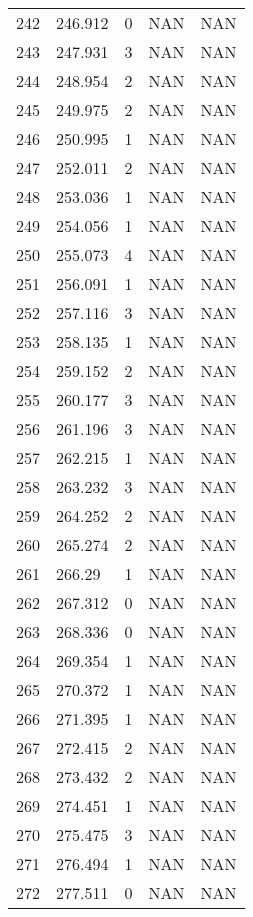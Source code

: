 \documentclass{article}
\begin{document}
\begin{longtable}{@{}lllll@{}}
				242 & 246.912 & 0     & NAN   & NAN   \\
				243 & 247.931 & 3     & NAN   & NAN   \\
				244 & 248.954 & 2     & NAN   & NAN   \\
				245 & 249.975 & 2     & NAN   & NAN   \\
				246 & 250.995 & 1     & NAN   & NAN   \\
				247 & 252.011 & 2     & NAN   & NAN   \\
				248 & 253.036 & 1     & NAN   & NAN   \\
				249 & 254.056 & 1     & NAN   & NAN   \\
				250 & 255.073 & 4     & NAN   & NAN   \\
				251 & 256.091 & 1     & NAN   & NAN   \\
				252 & 257.116 & 3     & NAN   & NAN   \\
				253 & 258.135 & 1     & NAN   & NAN   \\
				254 & 259.152 & 2     & NAN   & NAN   \\
				255 & 260.177 & 3     & NAN   & NAN   \\
				256 & 261.196 & 3     & NAN   & NAN   \\
				257 & 262.215 & 1     & NAN   & NAN   \\
				258 & 263.232 & 3     & NAN   & NAN   \\
				259 & 264.252 & 2     & NAN   & NAN   \\
				260 & 265.274 & 2     & NAN   & NAN   \\
				261 & 266.29  & 1     & NAN   & NAN   \\
				262 & 267.312 & 0     & NAN   & NAN   \\
				263 & 268.336 & 0     & NAN   & NAN   \\
				264 & 269.354 & 1     & NAN   & NAN   \\
				265 & 270.372 & 1     & NAN   & NAN   \\
				266 & 271.395 & 1     & NAN   & NAN   \\
				267 & 272.415 & 2     & NAN   & NAN   \\
				268 & 273.432 & 2     & NAN   & NAN   \\
				269 & 274.451 & 1     & NAN   & NAN   \\
				270 & 275.475 & 3     & NAN   & NAN   \\
				271 & 276.494 & 1     & NAN   & NAN   \\
				272 & 277.511 & 0     & NAN   & NAN   \\

\end{longtable}
\end{document}
